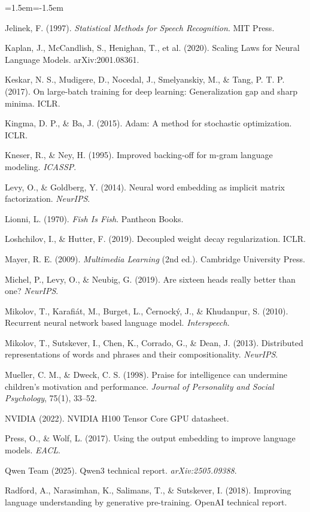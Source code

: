 \begin{list}{}{\leftmargin=1.5em\itemindent=-1.5em\itemsep=2pt\small}
\item Jelinek, F. (1997). \emph{Statistical Methods for Speech Recognition}. MIT Press.
\item Kaplan, J., McCandlish, S., Henighan, T., et al. (2020). Scaling Laws for Neural Language Models. arXiv:2001.08361.
\item Keskar, N. S., Mudigere, D., Nocedal, J., Smelyanskiy, M., \& Tang, P. T. P. (2017). On large-batch training for deep learning: Generalization gap and sharp minima. ICLR.
\item Kingma, D. P., \& Ba, J. (2015). Adam: A method for stochastic optimization. ICLR.
\item Kneser, R., \& Ney, H. (1995). Improved backing-off for m-gram language modeling. \emph{ICASSP}.
\item Levy, O., \& Goldberg, Y. (2014). Neural word embedding as implicit matrix factorization. \emph{NeurIPS}.
\item Lionni, L. (1970). \emph{Fish Is Fish}. Pantheon Books.
\item Loshchilov, I., \& Hutter, F. (2019). Decoupled weight decay regularization. ICLR.
\item Mayer, R. E. (2009). \emph{Multimedia Learning} (2nd ed.). Cambridge University Press.
\item Michel, P., Levy, O., \& Neubig, G. (2019). Are sixteen heads really better than one? \emph{NeurIPS}.
\item Mikolov, T., Karafi\'at, M., Burget, L., \v{C}ernock\'y, J., \& Khudanpur, S. (2010). Recurrent neural network based language model. \emph{Interspeech}.
\item Mikolov, T., Sutskever, I., Chen, K., Corrado, G., \& Dean, J. (2013). Distributed representations of words and phrases and their compositionality. \emph{NeurIPS}.
\item Mueller, C. M., \& Dweck, C. S. (1998). Praise for intelligence can undermine children's motivation and performance. \emph{Journal of Personality and Social Psychology}, 75(1), 33--52.
\item NVIDIA (2022). NVIDIA H100 Tensor Core GPU datasheet.
\item Press, O., \& Wolf, L. (2017). Using the output embedding to improve language models. \emph{EACL}.
\item Qwen Team (2025). Qwen3 technical report. \emph{arXiv:2505.09388}.
\item Radford, A., Narasimhan, K., Salimans, T., \& Sutskever, I. (2018). Improving language understanding by generative pre-training. OpenAI technical report.

\end{list}
